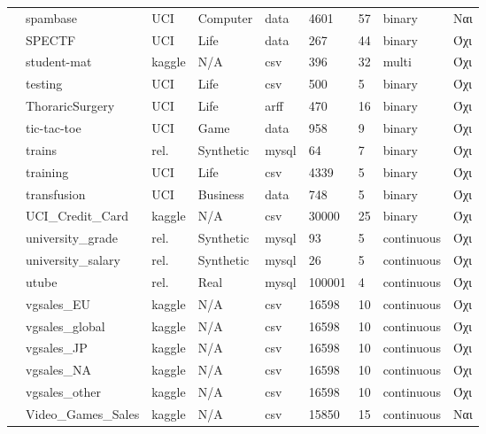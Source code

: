 {\begin{longtable}{|l| l| l | l | l | l |l | l | l | }
 				\rownumber & spambase \citep{spam} & UCI & Computer & data & 4601 & 57 & binary & Ναι  \\
 				\rownumber & SPECTF \citep{spectf} & UCI & Life & data & 267 & 44 & binary & Όχι \\
 				\rownumber & student-mat \citep{alcohol} & kaggle & N/A & csv & 396 & 32 & multi & Όχι \\
 				\rownumber & testing \citep{wilt} & UCI & Life & csv & 500 & 5 & binary & Όχι \\
 				\rownumber & ThoraricSurgery  \citep{thoraric}& UCI & Life & arff & 470 & 16 & binary & Όχι  \\
 				\rownumber & tic-tac-toe \citep{tic} & UCI & Game & data & 958 & 9 &  binary & Όχι \\
 				\rownumber & trains \citep{Trains} & rel. & Synthetic & mysql & 64 & 7 & binary & Όχι \\
 				\rownumber & training \citep{wilt} & UCI & Life  & csv & 4339 & 5 & binary & Όχι \\
 				\rownumber & transfusion & UCI & Business & data & 748 & 5 & binary& Όχι \\
 				\rownumber & UCI\_Credit\_Card & kaggle & N/A & csv & 30000 & 25 & binary & Όχι \\
 				\rownumber & university\_grade \citep{uni} & rel. & Synthetic & mysql & 93 & 5  & continuous & Όχι \\
 				\rownumber & university\_salary \citep{uni} & rel. & Synthetic & mysql & 26 & 5 & continuous & Όχι \\
 				\rownumber & utube \citep{utube} & rel. & Real & mysql & 100001 & 4 & continuous & Όχι \\
 					\rownumber & vgsales\_EU \citep{vgsales} & kaggle & N/A & csv  & 16598 & 10 & continuous & Όχι\\
 					\rownumber & vgsales\_global \citep{vgsales} & kaggle & N/A & csv  & 16598 & 10 & continuous & Όχι \\
 					\rownumber & vgsales\_JP \citep{vgsales} & kaggle & N/A & csv  & 16598 & 10 & continuous & Όχι \\
 					\rownumber & vgsales\_NA \citep{vgsales} & kaggle & N/A & csv  & 16598 & 10 & continuous & Όχι \\
 					\rownumber & vgsales\_other \citep{vgsales} & kaggle & N/A & csv  & 16598 & 10 & continuous & Όχι \\
 					\rownumber & Video\_Games\_Sales \citep{vgames} & kaggle & N/A & csv & 15850 & 15 & continuous & Ναι \\

\end{longtable}}

